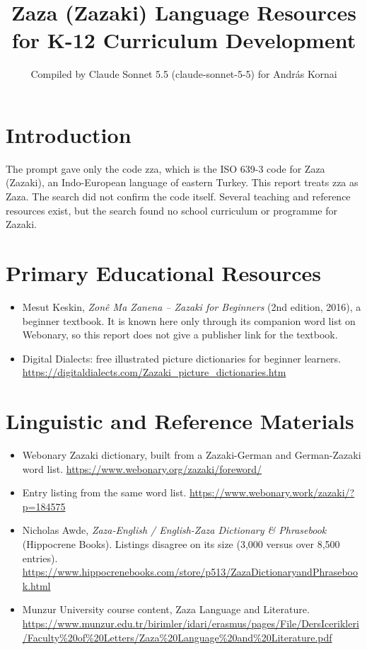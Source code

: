 \documentclass[12pt]{article}
\title{Zaza (Zazaki) Language Resources for K-12 Curriculum Development}
\author{Compiled by Claude Sonnet 5.5 (claude-sonnet-5-5) for Andr\'as Kornai}
\date{}
\begin{document}
\maketitle

\section{Introduction}
The prompt gave only the code zza, which is the ISO 639-3 code for Zaza (Zazaki), an Indo-European language of eastern Turkey. This report treats zza as Zaza. The search did not confirm the code itself. Several teaching and reference resources exist, but the search found no school curriculum or programme for Zazaki.

\section{Primary Educational Resources}
\begin{itemize}
\item Mesut Keskin, \emph{Zon\^e Ma Zanena -- Zazaki for Beginners} (2nd edition, 2016), a beginner textbook. It is known here only through its companion word list on Webonary, so this report does not give a publisher link for the textbook.
\item Digital Dialects: free illustrated picture dictionaries for beginner learners. \url{https://digitaldialects.com/Zazaki_picture_dictionaries.htm}
\end{itemize}

\section{Linguistic and Reference Materials}
\begin{itemize}
\item Webonary Zazaki dictionary, built from a Zazaki-German and German-Zazaki word list. \url{https://www.webonary.org/zazaki/foreword/}
\item Entry listing from the same word list. \url{https://www.webonary.work/zazaki/?p=184575}
\item Nicholas Awde, \emph{Zaza-English / English-Zaza Dictionary \& Phrasebook} (Hippocrene Books). Listings disagree on its size (3,000 versus over 8,500 entries). \url{https://www.hippocrenebooks.com/store/p513/ZazaDictionaryandPhrasebook.html}
\item Munzur University course content, Zaza Language and Literature. \url{https://www.munzur.edu.tr/birimler/idari/erasmus/pages/File/DersIcerikleri/Faculty%20of%20Letters/Zaza%20Language%20and%20Literature.pdf}
\end{itemize}
\end{document}
